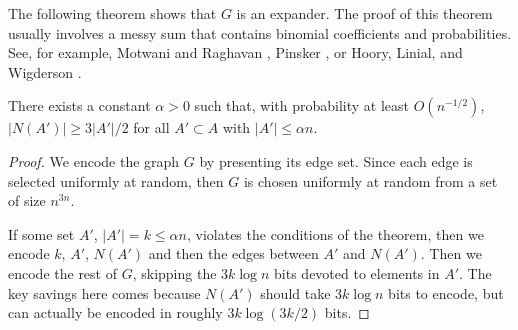 \documentclass{patmorin}
\begin{document}
The following theorem shows that $G$ is an expander.  The proof of
this theorem usually involves a messy sum that contains binomial
coefficients and probabilities.  See, for example, Motwani and
Raghavan \cite[Theorem~5.3]{motwani.raghavan:randomized}, Pinsker
\cite[Lemma 1]{pinsker:on}, or Hoory, Linial, and Wigderson
\cite[Lemma~1.9]{hoory.linial.ea:expander}.

\begin{thm}
  There exists a constant $\alpha >0$ such that, with probability at
  least $O(n^{-1/2})$, $|N(A')| \ge 3|A'|/2$ for all $A'\subset A$
  with $|A'|\le \alpha n$.
\end{thm}

\begin{proof}
  We encode the graph $G$ by presenting its edge set. Since each edge
  is selected uniformly at random, then $G$ is chosen uniformly at
  random from a set of size $n^{3n}$.

  If some set $A'$, $|A'|=k\le \alpha n$, violates the conditions of
  the theorem, then we encode $k$, $A'$, $N(A')$ and then the edges
  between $A'$ and $N(A')$. Then we encode the rest of $G$, skipping
  the $3k\log n$ bits devoted to elements in $A'$.  The key savings
  here comes because $N(A')$ should take $3k\log n$ bits to encode,
  but can actually be encoded in roughly $3k\log(3k/2)$ bits.


\end{proof}
\end{document}
